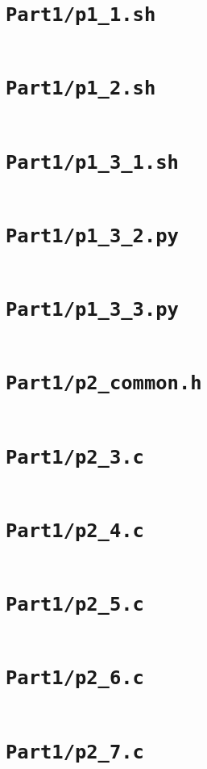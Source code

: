 \newpage
\onecolumn

\appendices

\section{\texttt{Part1/p1\_1.sh}}
\label{code:1_1}
\inputminted{bash}{../Part1/p1_1.sh}
\newpage

\section{\texttt{Part1/p1\_2.sh}}
\label{code:1_2}
\inputminted{bash}{../Part1/p1_2.sh}
\newpage

\section{\texttt{Part1/p1\_3\_1.sh}}
\label{code:1_3_1}
\inputminted{bash}{../Part1/p1_3_1.sh}
\newpage

\section{\texttt{Part1/p1\_3\_2.py}}
\label{code:1_3_2}
\inputminted{python}{../Part1/p1_3_2.py}
\newpage

\section{\texttt{Part1/p1\_3\_3.py}}
\label{code:1_3_3}
\inputminted{python}{../Part1/p1_3_3.py}
\newpage

\section{\texttt{Part1/p2\_common.h}}
\label{code:2_common}
\inputminted{c}{../Part1/p2_common.h}
\newpage

\section{\texttt{Part1/p2\_3.c}}
\label{code:2_3}
\inputminted{c}{../Part1/p2_3.c}
\newpage

\section{\texttt{Part1/p2\_4.c}}
\label{code:2_4}
\inputminted{c}{../Part1/p2_4.c}
\newpage

\section{\texttt{Part1/p2\_5.c}}
\label{code:2_5}
\inputminted{c}{../Part1/p2_5.c}
\newpage

\section{\texttt{Part1/p2\_6.c}}
\label{code:2_6}
\inputminted{c}{../Part1/p2_6.c}
\newpage

\section{\texttt{Part1/p2\_7.c}}
\label{code:2_7}
\inputminted{c}{../Part1/p2_7.c}
